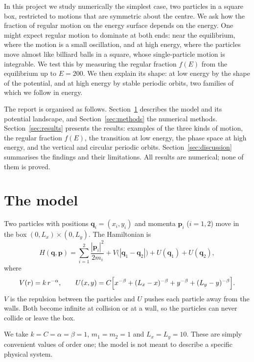 \documentclass[11pt,a4paper]{article}
\newcommand{\q}{\mathbf{q}}
\newcommand{\p}{\mathbf{p}}
\begin{document}
In this project we study numerically the simplest case, two particles in a
square box, restricted to motions that are symmetric about the centre. We ask
how the fraction of regular motion on the energy surface depends on the
energy. One might expect regular motion to dominate at both ends: near the
equilibrium, where the motion is a small oscillation, and at high energy,
where the particles move almost like billiard balls in a square, whose
single-particle motion is integrable. We test this by measuring the regular
fraction $f(E)$ from the equilibrium up to $E=200$. We then explain its shape:
at low energy by the shape of the potential, and at high energy by stable
periodic orbits, two families of which we follow in energy.

The report is organised as follows. Section~\ref{sec:model} describes the
model and its potential landscape, and Section~\ref{sec:methods} the numerical
methods. Section~\ref{sec:results} presents the results: examples of the three
kinds of motion, the regular fraction $f(E)$, the transition at low energy,
the phase space at high energy, and the vertical and circular periodic orbits.
Section~\ref{sec:discussion} summarises the findings and their limitations.
All results are numerical; none of them is proved.

\section{The model}\label{sec:model}

Two particles with positions $\q_i=(x_i,y_i)$ and momenta $\p_i$ ($i=1,2$)
move in the box $(0,L_x)\times(0,L_y)$. The Hamiltonian is
\begin{equation}\label{eq:H}
  H(\q,\p)=\sum_{i=1}^{2}\frac{|\p_i|^2}{2m_i}
  + V\bigl(|\q_1-\q_2|\bigr) + U(\q_1) + U(\q_2),
\end{equation}
where
\begin{equation}\label{eq:potentials}
  V(r)=k\,r^{-\alpha},\qquad
  U(x,y)=C\Bigl[x^{-\beta}+(L_x-x)^{-\beta}+y^{-\beta}+(L_y-y)^{-\beta}\Bigr].
\end{equation}
$V$ is the repulsion between the particles and $U$ pushes each particle away
from the walls. Both become infinite at collision or at a wall, so the
particles can never collide or leave the box.

We take $k=C=\alpha=\beta=1$, $m_1=m_2=1$ and $L_x=L_y=10$. These are simply
convenient values of order one; the model is not meant to describe a specific
physical system.
\end{document}
